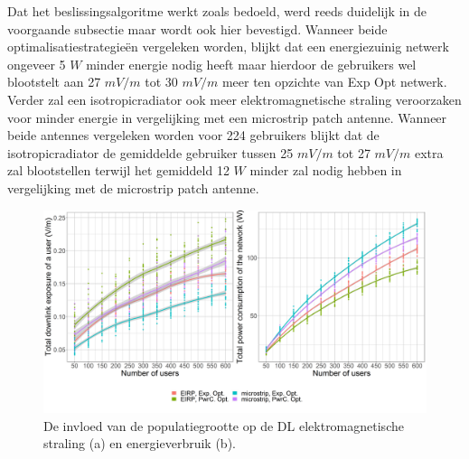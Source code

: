 \documentclass[twocolumn]{phdsymp_dutch}
\begin{document}
Dat het beslissingsalgoritme werkt zoals bedoeld, werd reeds duidelijk in de voorgaande subsectie maar wordt
ook hier bevestigd. Wanneer beide optimalisatiestrategieën vergeleken worden,
blijkt dat een energiezuinig netwerk ongeveer 5 $W$ minder energie nodig heeft maar hierdoor de gebruikers wel 
blootstelt aan 27 $mV/m$ tot 30 $mV/m$ meer ten opzichte van \gls{Exp Opt} netwerk.
Verder zal een \gls{isotropicradiator} ook meer elektromagnetische straling veroorzaken 
voor minder energie in vergelijking met een microstrip patch antenne.
Wanneer beide antennes vergeleken worden voor 224 gebruikers blijkt 
dat de \gls{isotropicradiator} de gemiddelde gebruiker tussen 
 25 $mV/m$ tot 27 $mV/m$ extra zal blootstellen
 terwijl het gemiddeld 12 $W$ minder zal nodig hebben in vergelijking met de microstrip patch antenne.


\begin{figure}[h!]
  \includegraphics[width=\linewidth]{../results/s3/uvsdlAndPc.png}
  \caption{ De invloed van de populatiegrootte op de \acs{DL} elektromagnetische straling (a) en energieverbruik (b).
    }
  \label{fig:s3b_dlAndPC}
\end{figure}
\end{document}
